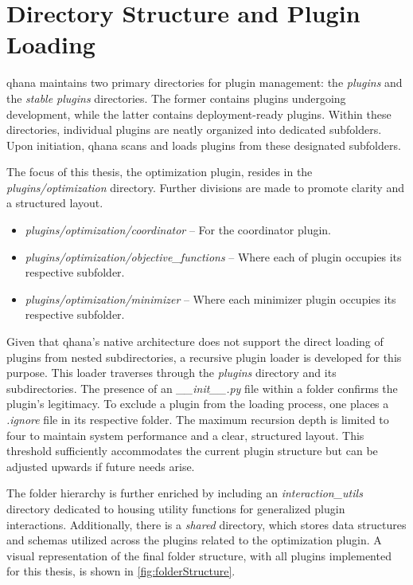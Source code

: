 \documentclass[
  a4paper,  %
  twoside,  %
  bibliography=totoc,
  headsepline,
  cleardoublepage=empty,
  parskip=half,
  draft=false
]{scrbook}
\begin{document}
\section{Directory Structure and Plugin Loading}
\label{sec:directoryStructure}

\gls{qhana} maintains two primary directories for plugin management: the \textit{plugins} and the \textit{stable plugins} directories.
The former contains plugins undergoing development, while the latter contains deployment-ready plugins.
Within these directories, individual plugins are neatly organized into dedicated subfolders.
Upon initiation, \gls{qhana} scans and loads plugins from these designated subfolders.

The focus of this thesis, the optimization plugin, resides in the \textit{plugins/optimization} directory.
Further divisions are made to promote clarity and a structured layout.

\begin{itemize}
  \item \textit{plugins/optimization/coordinator} – For the coordinator plugin.
  \item \textit{plugins/optimization/objective\_functions} – Where each \gls{of} plugin occupies its respective subfolder.
  \item \textit{plugins/optimization/minimizer} – Where each minimizer plugin occupies its respective subfolder.
\end{itemize}

Given that \gls{qhana}'s native architecture does not support the direct loading of plugins from nested subdirectories, a recursive plugin loader is developed for this purpose.
This loader traverses through the \textit{plugins} directory and its subdirectories.
The presence of an \textit{\_\_init\_\_.py} file within a folder confirms the plugin's legitimacy.
To exclude a plugin from the loading process, one places a \textit{.ignore} file in its respective folder.
The maximum recursion depth is limited to four to maintain system performance and a clear, structured layout.
This threshold sufficiently accommodates the current plugin structure but can be adjusted upwards if future needs arise.

The folder hierarchy is further enriched by including an \textit{interaction\_utils} directory dedicated to housing utility functions for generalized plugin interactions.
Additionally, there is a \textit{shared} directory, which stores data structures and schemas utilized across the plugins related to the optimization plugin.
A visual representation of the final folder structure, with all plugins implemented for this thesis, is shown in \cref{fig:folderStructure}.
\end{document}
